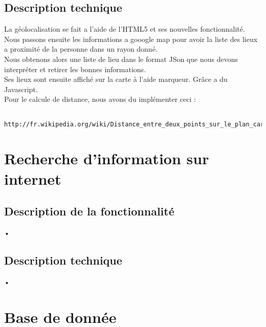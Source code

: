 \documentclass[10pt,a4paper]{report}
\begin{document}
\subsection{Description technique}
\begin{flushleft}
La géolocalisation se fait a l'aide de l'HTML5 et ses nouvelles fonctionnalité. Nous passons ensuite les informations a gooogle map pour avoir la liste des lieux a proximité de la personne dans un rayon donné. \\
Nous obtenons alors une liste de lieu dans le format JSon que nous devons interpréter et retirer les bonnes informations.\\
Ses lieux sont ensuite affiché sur la carte à l'aide marqueur. Grâce a du Javascript. \\

Pour le calcule de distance, nous avons du implémenter ceci : 
\begin{verbatim}
	http://fr.wikipedia.org/wiki/Distance_entre_deux_points_sur_le_plan_cart%C3%A9sien$ 
\end{verbatim}
\end{flushleft}



\section{Recherche d'information sur internet}

\subsection{Description de la fonctionnalité}
\begin{flushleft}
•
\end{flushleft}

\subsection{Description technique}
\begin{flushleft}
•
\end{flushleft}


\section{Base de donnée}
\end{document}
